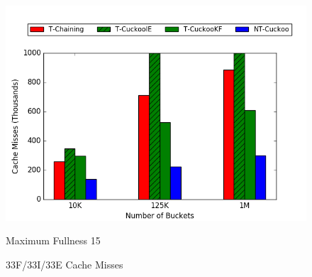 \begin{figure}[H]
\begin{minipage}{.5\textwidth}
        \includegraphics[width=\linewidth]{maps/3315cm.png}
        \caption*{Maximum Fullness 15}
    \end{minipage}
    \caption{33F/33I/33E Cache Misses}
\end{figure}

